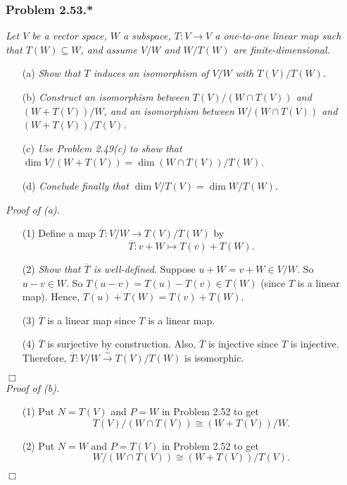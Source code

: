\documentclass{article}
\begin{document}
\subsubsection*{Problem 2.53.*}
\emph{Let $V$ be a vector space, $W$ a subspace,
$T : V \to V$ a one-to-one linear map such that $T(W) \subseteq W$,
and assume $V/W$ and $W/T(W)$ are finite-dimensional.}
\begin{enumerate}
\item[(a)]
  \emph{Show that $T$ induces an isomorphism of $V/W$ with $T(V)/T(W)$.}

\item[(b)]
  \emph{Construct an isomorphism between $T(V)/(W \cap T(V))$ and $(W+T(V))/W$,
  and an isomorphism between $W/(W \cap T(V))$ and $(W+T(V))/T(V)$.}

\item[(c)]
  \emph{Use Problem 2.49(c) to show that
  $\dim V/(W+T(V)) = \dim (W \cap T(V))/T(W)$.}

\item[(d)]
  \emph{Conclude finally that $\dim V/T(V) = \dim W/T(W)$.} \\
\end{enumerate}



\emph{Proof of (a).}
\begin{enumerate}
\item[(1)]
  Define a map $\overline{T}: V/W \to T(V)/T(W)$ by
  \[
    \overline{T}: v + W \mapsto T(v) + T(W).
  \]

\item[(2)]
  \emph{Show that $\overline{T}$ is well-defined}.
  Suppose $u + W = v + W \in V/W$.
  So $u - v \in W$.
  So $T(u - v) = T(u) - T(v) \in T(W)$ (since $T$ is a linear map).
  Hence, $T(u) + T(W) = T(v) + T(W)$.

\item[(3)]
  $\overline{T}$ is a linear map since $T$ is a linear map.

\item[(4)]
  $\overline{T}$ is surjective by construction.
  Also, $\overline{T}$ is injective since $T$ is injective.
  Therefore, $\overline{T}: V/W \xrightarrow{\sim} T(V)/T(W)$ is isomorphic.
\end{enumerate}
$\Box$ \\



\emph{Proof of (b).}
\begin{enumerate}
\item[(1)]
  Put $N = T(V)$ and $P = W$ in Problem 2.52 to get
  \[
    T(V)/(W \cap T(V)) \cong (W+T(V))/W.
  \]

\item[(2)]
  Put $N = W$ and $P = T(V)$ in Problem 2.52 to get
  \[
    W/(W \cap T(V)) \cong (W+T(V))/T(V).
  \]
\end{enumerate}
$\Box$ \\
\end{document}

